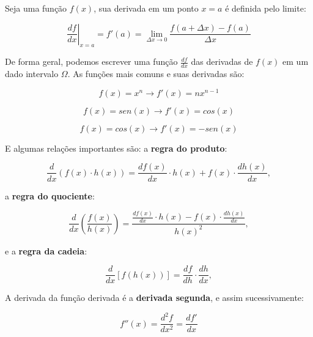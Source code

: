         Seja uma função $f(x)$, sua derivada em um ponto $x=a$ é definida pelo limite:

        \begin{equation*}
            \left.\frac{df}{dx}\right|_{x=a} = f'(a) = \lim_{\Delta x\rightarrow 0 }\frac{f(a+\Delta x)-f(a)}{\Delta x}
        \end{equation*}

        De forma geral, podemos escrever uma função $\frac{df}{dx}$ das derivadas de $f(x)$ em um dado intervalo $\Omega$. As funções mais comuns e suas derivadas são:

        \begin{equation*}
            f(x) = x^n \rightarrow f'(x) = n x^{n-1}
        \end{equation*}

        \begin{equation*}
            f(x) = sen(x) \rightarrow f'(x) = cos(x)
        \end{equation*}

        \begin{equation*}
            f(x) = cos(x) \rightarrow f'(x) = -sen(x)
        \end{equation*}

        E algumas relações importantes são: a \textbf{regra do produto}:

        \begin{equation*}
            \frac{d}{dx}\left(f(x) \cdot h(x)\right) = \frac{df(x)}{dx} \cdot h(x) + f(x) \cdot \frac{dh(x)}{dx},
        \end{equation*}

        \noindent a \textbf{regra do quociente}:

        \begin{equation*}
            \frac{d}{dx}\left(\frac{f(x)}{ h(x)}\right) = \frac{\frac{df(x)}{dx} \cdot h(x) - f(x) \cdot \frac{dh(x)}{dx}}{h(x)^2},
        \end{equation*}

        \noindent e a \textbf{regra da cadeia}:

        \begin{equation*}
            \frac{d}{dx}\left[f(h(x))\right] = \frac{df}{dh} \cdot \frac{dh}{dx},
        \end{equation*}

        A derivada da função derivada é a \textbf{derivada segunda}, e assim sucessivamente:

        \begin{equation*}
            f''(x) = \frac{d^2f}{dx^2} = \frac{df'}{dx}
        \end{equation*}

